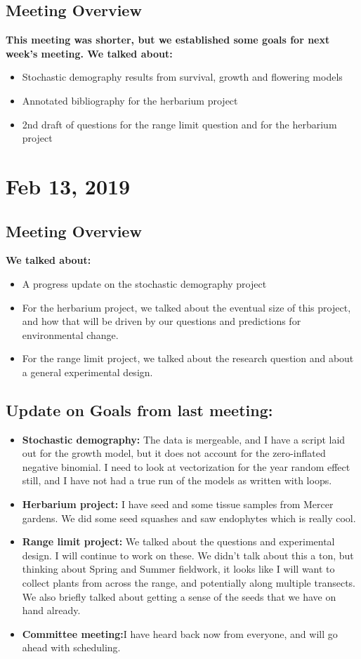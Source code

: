 \documentclass{article}
\begin{document}
\subsection*{Meeting Overview}
\textbf{This meeting was shorter, but we established some goals for next week's meeting. We talked about:}
\begin{itemize}
\item{Stochastic demography results from survival, growth and flowering models}
\item{Annotated bibliography for the herbarium project}
\item{2nd draft of questions for the range limit question and for the herbarium project}
\end{itemize}

\section*{Feb 13, 2019}
\subsection*{Meeting Overview}
\textbf{We talked about:}
\begin{itemize}
\item{A progress update on the stochastic demography project}
\item{For the herbarium project, we talked about the eventual size of this project, and how that will be driven by our questions and predictions for environmental change.}
\item{For the range limit project, we talked about the research question and about a general experimental design.}
\end{itemize}

\subsection*{Update on Goals from last meeting:}
\begin{itemize}
\item{\textbf{Stochastic demography:} The data is mergeable, and I have a script laid out for the growth model, but it does not account for the zero-inflated negative binomial. I need to look at vectorization for the year random effect still, and I have not had a true run of the models as written with loops.}
\item{\textbf{Herbarium project:} I have seed and some tissue samples from Mercer gardens. We did some seed squashes and saw endophytes which is really cool.}
\item{\textbf{Range limit project:} We talked about the questions and experimental design. I will continue to work on these. We didn't talk about this a ton, but thinking about Spring and Summer fieldwork, it looks like I will want to collect plants from across the range, and potentially along multiple transects. We also briefly talked about getting a sense of the seeds that we have on hand already.}
\item{\textbf{Committee meeting:}I have heard back now from everyone, and will go ahead with scheduling.}
\end{itemize}
\end{document}
